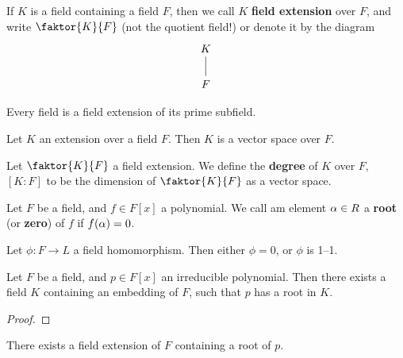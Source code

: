 \begin{definition}
    If $K$ is a field containing a field $F$, then we call  $K$  \textbf{field
    extension} over $F$, and write  $\faktor{K}{F}$ (not the quotient field!) or
    denote it by the diagram
    \[\begin{tikzcd}
        K \\
        F
        \arrow[no head, from=1-1, to=2-1]
    \end{tikzcd}\]
\end{definition}

\begin{lemma}\label{1.1.2}
    Every field is a field extension of its prime subfield.
\end{lemma}

\begin{lemma}\label{1.1.3}
    Let $K$ an extension over a field  $F$. Then  $K$ is a vector space over
    $F$.
\end{lemma}

\begin{definition}
    Let $\faktor{K}{F}$ a field extension. We define the \textbf{degree} of $K$
    over $F$, $[K:F]$ to be the dimension of  $\faktor{K}{F}$ as a vector space.
\end{definition}

\begin{definition}
    Let $F$ be a field, and  $f \in F[x]$ a polynomial. We call am element $\alpha
    \in R$ a  \textbf{root} (or \textbf{zero}) of $f$ if  $f(\alpha)=0$.
\end{definition}

\begin{lemma}\label{1.1.4}
    Let $\phi:F \xrightarrow{} L$ a field homomorphism. Then either $\phi=0$, or
     $\phi$ is 1--1.
\end{lemma}

\begin{lemma}\label{1.1.5}
    Let $F$ be a field, and  $p \in F[x]$ an irreducible polynomial. Then there
    exists a field $K$ containing an embedding of  $F$, such that  $p$ has a
    root in  $K$.
\end{lemma}
\begin{proof}
\end{proof}
\begin{corollary}
    There exists a field extension of $F$ containing a root of  $p$.
\end{corollary}
